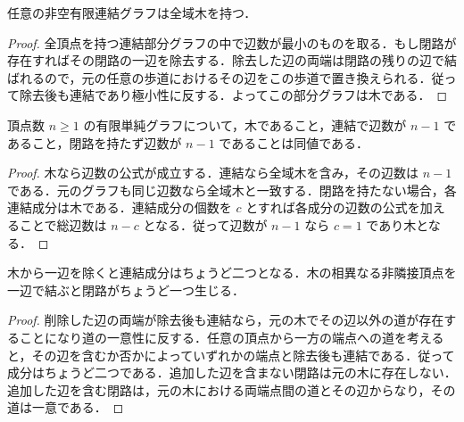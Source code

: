 \begin{prop}[全域木の存在]
任意の非空有限連結グラフは全域木を持つ．
\end{prop}
\begin{proof}
全頂点を持つ連結部分グラフの中で辺数が最小のものを取る．もし閉路が存在すればその閉路の一辺を除去する．除去した辺の両端は閉路の残りの辺で結ばれるので，元の任意の歩道におけるその辺をこの歩道で置き換えられる．従って除去後も連結であり極小性に反する．よってこの部分グラフは木である．
\end{proof}
\begin{prop}[有限木の特徴付け]
頂点数 $n\geq1$ の有限単純グラフについて，木であること，連結で辺数が $n-1$ であること，閉路を持たず辺数が $n-1$ であることは同値である．
\end{prop}
\begin{proof}
木なら辺数の公式が成立する．連結なら全域木を含み，その辺数は $n-1$ である．元のグラフも同じ辺数なら全域木と一致する．閉路を持たない場合，各連結成分は木である．連結成分の個数を $c$ とすれば各成分の辺数の公式を加えることで総辺数は $n-c$ となる．従って辺数が $n-1$ なら $c=1$ であり木となる．
\end{proof}
\begin{prop}[木の辺の削除と追加]
木から一辺を除くと連結成分はちょうど二つとなる．木の相異なる非隣接頂点を一辺で結ぶと閉路がちょうど一つ生じる．
\end{prop}
\begin{proof}
削除した辺の両端が除去後も連結なら，元の木でその辺以外の道が存在することになり道の一意性に反する．任意の頂点から一方の端点への道を考えると，その辺を含むか否かによっていずれかの端点と除去後も連結である．従って成分はちょうど二つである．追加した辺を含まない閉路は元の木に存在しない．追加した辺を含む閉路は，元の木における両端点間の道とその辺からなり，その道は一意である．
\end{proof}
